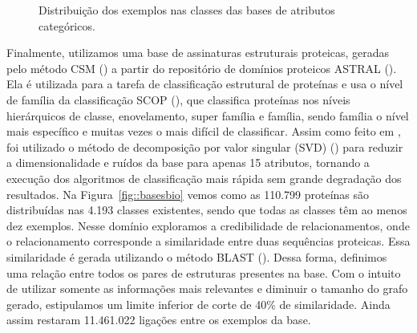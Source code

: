 \begin{figure}[h]

\caption{Distribuição dos exemplos nas classes das bases de atributos categóricos.}
\label{fig::basescategorias}
\end{figure}

Finalmente, utilizamos uma base de assinaturas estruturais proteicas, geradas pelo método \textsc{CSM} (\cite{dpires_bmc_2011}) a partir do repositório de domínios proteicos ASTRAL (\cite{Brenner00}).
Ela é utilizada para a tarefa de classificação estrutural de proteínas e usa o nível de família da classificação \textsc{SCOP} (\cite{SCOP95}), que classifica proteínas nos níveis hierárquicos de classe, enovelamento, super família e família, sendo família o nível mais específico e muitas vezes o mais difícil de classificar. Assim como feito em \cite{dpires_bmc_2011}, foi utilizado o método de decomposição por valor singular (\textsc{SVD}) (\cite{SVD}) para reduzir a dimensionalidade e ruídos da base para apenas 15 atributos, tornando a execução dos algoritmos de classificação mais rápida sem grande degradação dos resultados. 
Na Figura~\ref{fig::basesbio} vemos como as 110.799 proteínas são distribuídas nas 4.193 classes existentes, sendo que todas as classes têm ao menos dez exemplos.
Nesse domínio exploramos a credibilidade de relacionamentos, onde o relacionamento corresponde a similaridade entre duas sequências proteicas. Essa similaridade é gerada utilizando o método \textsc{BLAST} (\cite{altschul90}). Dessa forma, definimos uma relação entre todos os pares de estruturas presentes na base. Com o intuito de utilizar somente as informações mais relevantes e diminuir o tamanho do grafo gerado, estipulamos um limite inferior de corte de 40\% de similaridade. Ainda assim restaram 11.461.022 ligações entre os exemplos da base.

